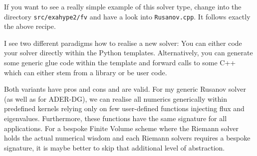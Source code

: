 \begin{remark}
 If you want to see a really simple example of this solver type, change into the 
 directory \texttt{src/exahype2/fv} and have a look into \texttt{Rusanov.cpp}.
 It follows exactly the above recipe.
\end{remark}


\noindent
I see two different paradigms how to realise a new solver: 
You can either code your solver directly within the Python templates.
Alternatively, you can generate some generic glue code within the template and
forward calls to some C++ which can either stem from a library or be user
code.


Both variants have pros and cons and are valid.
For my generic Rusanov solver (as well as for ADER-DG), we can realise all
numerics generically within predefined kernels relying only on few user-defined
functions injecting flux and eigenvalues.
Furthermore, these functions have the same signature for all applications.
For a bespoke Finite Volume scheme where the Riemann solver holds the actual
numerical wisdom and each Riemann solvers requires a bespoke signature, it is
maybe better to skip that additional level of abstraction.



